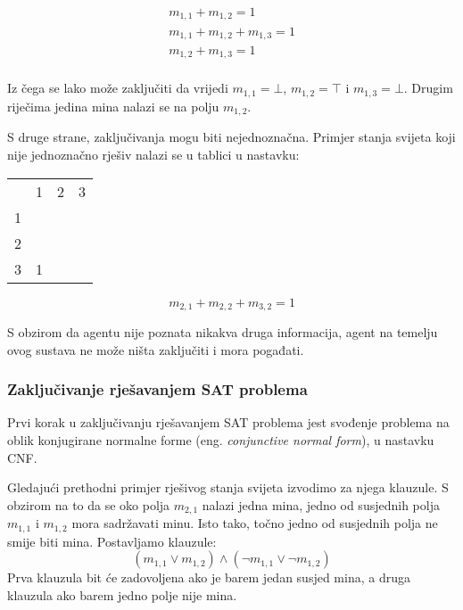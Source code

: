 \documentclass{article}
\begin{document}
\begin{align*}
    m_{1, 1} + m_{1, 2} = 1 \\
    m_{1, 1} + m_{1, 2} + m_{1, 3} = 1 \\
    m_{1, 2} + m_{1, 3} = 1 \\
\end{align*}

Iz čega se lako može zaključiti da vrijedi $m_{1, 1} = \bot$, $m_{1, 2} = \top$ i
$m_{1, 3} = \bot$. Drugim riječima jedina mina nalazi se na polju $m_{1, 2}$.

S druge strane, zaključivanja mogu biti nejednoznačna. Primjer stanja svijeta koji nije
jednoznačno rješiv nalazi se u tablici u nastavku:
\begin{table}[ht]
    \centering
    \begin{tabular}{llll}
                           & 1                      & 2                     & 3                     \\ \cline{2-4}
    \multicolumn{1}{l|}{1} & \multicolumn{1}{l|}{}  & \multicolumn{1}{l|}{} & \multicolumn{1}{l|}{} \\ \cline{2-4}
    \multicolumn{1}{l|}{2} & \multicolumn{1}{l|}{}  & \multicolumn{1}{l|}{} & \multicolumn{1}{l|}{} \\ \cline{2-4}
    \multicolumn{1}{l|}{3} & \multicolumn{1}{l|}{1} & \multicolumn{1}{l|}{} & \multicolumn{1}{l|}{} \\ \cline{2-4}
    \end{tabular}
\end{table}

\begin{equation*}
    m_{2, 1} + m_{2, 2} + m_{3, 2} = 1
\end{equation*}

S obzirom da agentu nije poznata nikakva druga informacija, agent na temelju ovog sustava ne
može ništa zaključiti i mora pogađati.

\subsubsection{Zaključivanje rješavanjem SAT problema}
Prvi korak u zaključivanju rješavanjem SAT problema jest svođenje
problema na oblik konjugirane normalne forme (eng. \textit{conjunctive normal form}), u nastavku CNF.

Gledajući prethodni primjer rješivog stanja svijeta izvodimo za njega klauzule. 
S obzirom na to da se oko polja $m_{2, 1}$ nalazi jedna mina, jedno od susjednih polja $m_{1,1}$ i $m_{1, 2}$ mora sadržavati minu. Isto tako, točno jedno od susjednih polja ne smije biti mina. Postavljamo klauzule:
\begin{equation*}
    (m_{1, 1} \vee m_{1, 2}) \wedge (\neg m_{1, 1} \vee \neg m_{1, 2})
\end{equation*}
Prva klauzula bit će zadovoljena ako
je barem jedan susjed mina, a druga klauzula ako barem jedno polje nije mina.
\end{document}
